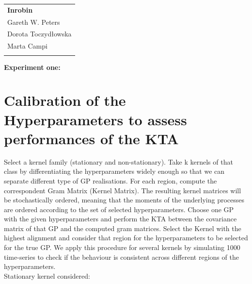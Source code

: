 \documentclass[11pt, a4paper]{article} %
\begin{document}
	
	
\setlength{\parindent}{0pt} %
\onehalfspacing				%


\begin{tabular}{p{15.5cm}}
	{\large \textbf{Inrobin}} \\
	Gareth W. Peters  \\ 
	Dorota Toczydłowska\\
	Marta Campi\\
	\hline
	\\
\end{tabular}

\vspace*{0.3cm}				%


\begin{center}
	{\LARGE \textbf{Experiment one:}}
	\vspace{2mm}	
\end{center} 

\section*{Calibration of the Hyperparameters to assess performances of the KTA}
Select a kernel family (stationary and non-stationary). Take k kernels of that class by differentiating the hyperparameters widely enough so that we can separate different type of GP realisations. For each region, compute the correspondent Gram Matrix (Kernel Matrix). The resulting kernel matrices will be stochastically ordered, meaning that the moments of the underlying processes are ordered according to the set of selected hyperparameters. Choose one GP with the given hyperparameters and perform the KTA between the covariance matrix of that GP and the computed gram matrices. Select the Kernel with the highest alignment and consider that region for the hyperparameters to be selected for the true GP. We apply this procedure for several kernels by simulating 1000 time-series to check if the behaviour is consistent across different regions of the hyperparameters.\\

Stationary kernel considered:
\end{document}
